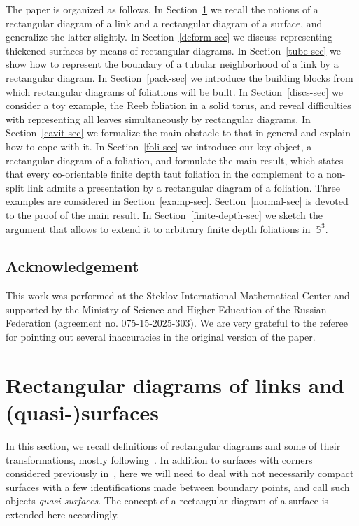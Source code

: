 \documentclass{amsart}
\theoremstyle{theorem}
\theoremstyle{remark}
\theoremstyle{definition}
\numberwithin{equation}{section}
\numberwithin{figure}{section}
\begin{document}
The paper is organized as follows. In Section~\ref{links-and-surfaces-sec} we recall
the notions of a rectangular diagram of a link and a rectangular diagram of a surface,
and generalize the latter slightly. In Section~\ref{deform-sec} we discuss representing
thickened surfaces by means of rectangular diagrams. In Section~\ref{tube-sec}
we show how to represent the boundary of a tubular neighborhood
of a link by a rectangular diagram. In Section~\ref{pack-sec} we introduce
the building blocks from which rectangular diagrams of foliations
will be built. In Section~\ref{discs-sec} we consider a toy example, the
Reeb foliation in a solid torus, and reveal difficulties
with representing all leaves simultaneously by rectangular diagrams.
In Section~\ref{cavit-sec} we formalize the main obstacle to that in
general and explain how to cope with it. In Section~\ref{foli-sec}
we introduce our key object, a rectangular diagram of a foliation,
and formulate the main result, which states that every co-orientable finite depth
taut foliation in the complement to a non-split link admits a presentation
by a rectangular diagram of a foliation. Three examples are considered in Section~\ref{examp-sec}.
Section~\ref{normal-sec} is devoted to the proof of the main result.
In Section~\ref{finite-depth-sec} we sketch the argument that allows to extend it
to arbitrary finite depth foliations in~$\mathbb S^3$.

\subsection*{Acknowledgement}
This work was performed at the Steklov International Mathematical Center and supported by the Ministry of Science and Higher Education of the Russian Federation (agreement no. 075-15-2025-303). We are very grateful to the referee for pointing out several
inaccuracies in the original version of the paper.

\section{Rectangular diagrams of links and (quasi-)surfaces}\label{links-and-surfaces-sec}
In this section, we recall definitions of rectangular diagrams and some of their transformations,
mostly following~\cite{Representability,Distinguishing,Basic_moves}.
In addition to surfaces with corners considered previously in~\cite{Representability}, here we will need to deal with
not necessarily compact surfaces with a few identifications made
between boundary points, and call such objects \emph{quasi-surfaces}. The concept
of a rectangular diagram of a surface is extended here accordingly.
\end{document}
